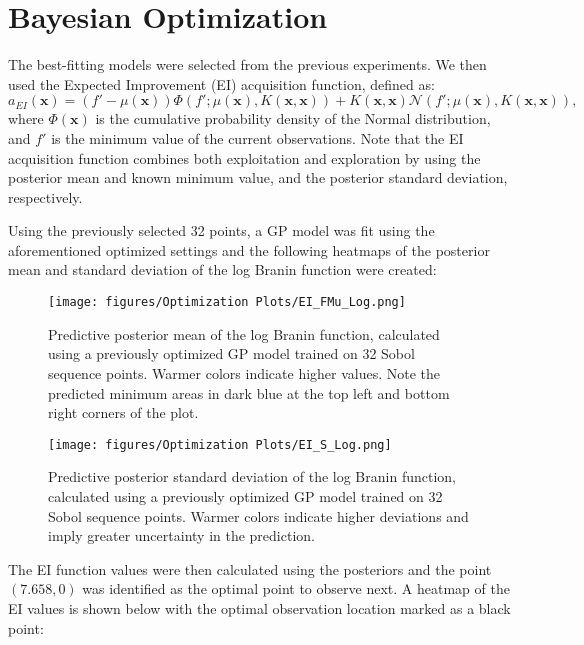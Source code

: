 \documentclass[11pt]{article}
\numberwithin{equation}{section}
\begin{document}
\section{Bayesian Optimization}

The best-fitting models were selected from the previous experiments. We then used the Expected Improvement (EI) acquisition function, defined as:
\begin{equation}
  a_{EI}(\bm{x}) = (f' - \mu(\bm{x}))\Phi(f';\mu(\bm{x}),K(\bm{x},\bm{x})) + K(\bm{x},\bm{x})\mathcal{N}(f';\mu(\bm{x}),K(\bm{x},\bm{x})),
  \label{eq:Expected Improvement}
\end{equation}
where $\Phi(\bm{x})$ is the cumulative probability density of the Normal distribution, and $f'$ is the minimum value of the current observations.
Note that the EI acquisition function combines both exploitation and exploration by using the posterior mean and known minimum value, and the posterior standard deviation, respectively. 

Using the previously selected 32 points, a GP model was fit using the aforementioned optimized settings and the following heatmaps of the posterior mean and standard deviation of the log Branin function were created:

\begin{figure}[H]
  \centering
  \texttt{[image: figures/Optimization Plots/EI\_FMu\_Log.png]}
  \caption{Predictive posterior mean of the log Branin function, calculated using a previously optimized GP model trained on 32 Sobol sequence points. Warmer colors indicate higher values. Note the predicted minimum areas in dark blue at the top left and bottom right corners of the plot.}
  \label{fig:ei-fmu-log}
\end{figure}

\begin{figure}[H]
  \centering
  \texttt{[image: figures/Optimization Plots/EI\_S\_Log.png]}
  \caption{Predictive posterior standard deviation of the log Branin function, calculated using a previously optimized GP model trained on 32 Sobol sequence points. Warmer colors indicate higher deviations and imply greater uncertainty in the prediction.}
  \label{fig:ei-fs-log}
\end{figure}

The EI function values were then calculated using the posteriors and the point $(7.658, 0)$ was identified as the optimal point to observe next. 
A heatmap of the EI values is shown below with the optimal observation location marked as a black point:
\end{document}

